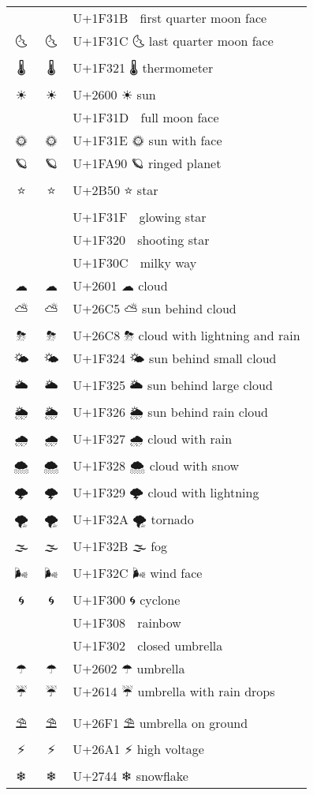 \documentclass[a4paper,12pt]{ltjarticle}
\newcommand{\fontA}[1]{{\fontspec[RawFeature={mode=harf,+dist,+ccmp}]{Segoe UI Emoji} #1}}
\newcommand{\fontB}[1]{{\fontspec[RawFeature={mode=harf,+dist,+ccmp}]{Noto Color Emoji} #1}}
\begin{document}
\begin{longtable}[c]{ccp{0.8\linewidth}}
\fontA{🌛}&\fontB{🌛}&U+1F31B 🌛 first quarter moon face\\
\fontA{🌜}&\fontB{🌜}&U+1F31C 🌜 last quarter moon face\\
\fontA{🌡}&\fontB{🌡}&U+1F321 🌡 thermometer\\
\fontA{☀}&\fontB{☀}&U+2600 ☀ sun\\
\fontA{🌝}&\fontB{🌝}&U+1F31D 🌝 full moon face\\
\fontA{🌞}&\fontB{🌞}&U+1F31E 🌞 sun with face\\
\fontA{🪐}&\fontB{🪐}&U+1FA90 🪐 ringed planet\\
\fontA{⭐}&\fontB{⭐}&U+2B50 ⭐ star\\
\fontA{🌟}&\fontB{🌟}&U+1F31F 🌟 glowing star\\
\fontA{🌠}&\fontB{🌠}&U+1F320 🌠 shooting star\\
\fontA{🌌}&\fontB{🌌}&U+1F30C 🌌 milky way\\
\fontA{☁}&\fontB{☁}&U+2601 ☁ cloud\\
\fontA{⛅}&\fontB{⛅}&U+26C5 ⛅ sun behind cloud\\
\fontA{⛈}&\fontB{⛈}&U+26C8 ⛈ cloud with lightning and rain\\
\fontA{🌤}&\fontB{🌤}&U+1F324 🌤 sun behind small cloud\\
\fontA{🌥}&\fontB{🌥}&U+1F325 🌥 sun behind large cloud\\
\fontA{🌦}&\fontB{🌦}&U+1F326 🌦 sun behind rain cloud\\
\fontA{🌧}&\fontB{🌧}&U+1F327 🌧 cloud with rain\\
\fontA{🌨}&\fontB{🌨}&U+1F328 🌨 cloud with snow\\
\fontA{🌩}&\fontB{🌩}&U+1F329 🌩 cloud with lightning\\
\fontA{🌪}&\fontB{🌪}&U+1F32A 🌪 tornado\\
\fontA{🌫}&\fontB{🌫}&U+1F32B 🌫 fog\\
\fontA{🌬}&\fontB{🌬}&U+1F32C 🌬 wind face\\
\fontA{🌀}&\fontB{🌀}&U+1F300 🌀 cyclone\\
\fontA{🌈}&\fontB{🌈}&U+1F308 🌈 rainbow\\
\fontA{🌂}&\fontB{🌂}&U+1F302 🌂 closed umbrella\\
\fontA{☂}&\fontB{☂}&U+2602 ☂ umbrella\\
\fontA{☔}&\fontB{☔}&U+2614 ☔ umbrella with rain drops\\
\fontA{⛱}&\fontB{⛱}&U+26F1 ⛱ umbrella on ground\\
\fontA{⚡}&\fontB{⚡}&U+26A1 ⚡ high voltage\\
\fontA{❄}&\fontB{❄}&U+2744 ❄ snowflake\\

\end{longtable}
\end{document}
